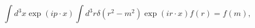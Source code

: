 \begin{equation}
\int d^{3}x\exp(ip\cdot x)\int d^{3}r\delta(r^{2}-m^{2})\exp(ir\cdot
x)f(r)=f(m),
\end{equation}%
